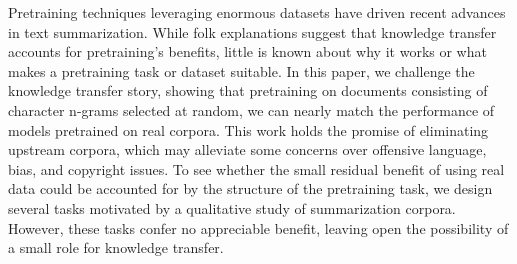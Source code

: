 Pretraining techniques leveraging enormous datasets have driven recent advances in text summarization. While folk explanations suggest that knowledge transfer accounts for pretraining's benefits, little is known about why it works or what makes a pretraining task or dataset suitable. In this paper, we challenge the knowledge transfer story, showing that pretraining on documents consisting of character n-grams selected at random, we can nearly match the performance of models pretrained on real corpora. This work holds the promise of eliminating upstream corpora, which may alleviate some concerns over offensive language, bias, and copyright issues. To see whether the small residual benefit of using real data could be accounted for by the structure of the pretraining task, we design several tasks motivated by a qualitative study of summarization corpora. However, these tasks confer no appreciable benefit, leaving open the possibility of a small role for knowledge transfer.
